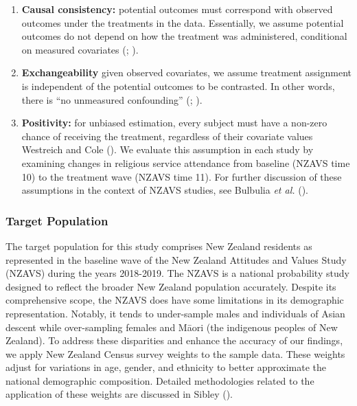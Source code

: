 \documentclass[
  single column]{article}
\begin{document}
\begin{enumerate}
\def\labelenumi{\arabic{enumi}.}
\item
  \textbf{Causal consistency:} potential outcomes must correspond with
  observed outcomes under the treatments in the data. Essentially, we
  assume potential outcomes do not depend on how the treatment was
  administered, conditional on measured covariates
  (;
  ).
\item
  \textbf{Exchangeability} given observed covariates, we assume
  treatment assignment is independent of the potential outcomes to be
  contrasted. In other words, there is ``no unmeasured confounding''
  (;
  ).
\item
  \textbf{Positivity:} for unbiased estimation, every subject must have
  a non-zero chance of receiving the treatment, regardless of their
  covariate values Westreich and Cole
  (). We evaluate this assumption in
  each study by examining changes in religious service attendance from
  baseline (NZAVS time 10) to the treatment wave (NZAVS time 11). For
  further discussion of these assumptions in the context of NZAVS
  studies, see Bulbulia \emph{et al.}
  ().
\end{enumerate}

\subsubsection{Target Population}\label{target-population}

The target population for this study comprises New Zealand residents as
represented in the baseline wave of the New Zealand Attitudes and Values
Study (NZAVS) during the years 2018-2019. The NZAVS is a national
probability study designed to reflect the broader New Zealand population
accurately. Despite its comprehensive scope, the NZAVS does have some
limitations in its demographic representation. Notably, it tends to
under-sample males and individuals of Asian descent while over-sampling
females and Māori (the indigenous peoples of New Zealand). To address
these disparities and enhance the accuracy of our findings, we apply New
Zealand Census survey weights to the sample data. These weights adjust
for variations in age, gender, and ethnicity to better approximate the
national demographic composition. Detailed methodologies related to the
application of these weights are discussed in Sibley
().
\end{document}
